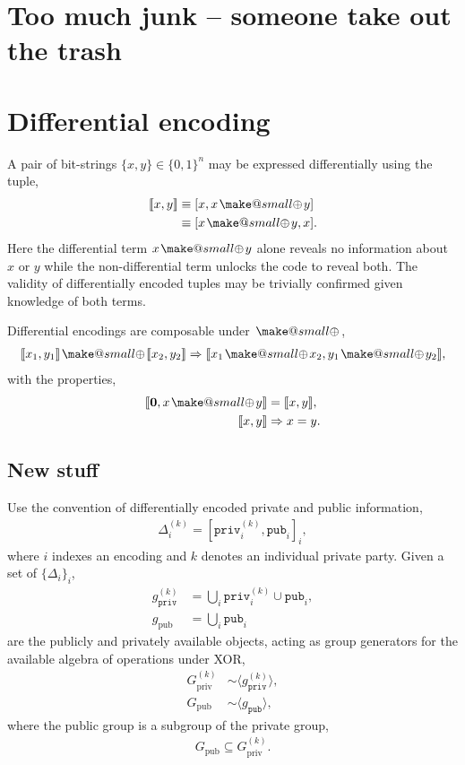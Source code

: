 \documentclass[twocolumn, aps, amsmath, amssymb, nofootinbib, superscriptaddress, longbibliography, doublefloatfix, table-of-contents, eqsecnum, rmp]{revtex4-2}
\makeatletter
\def\zerovec{\mathbf{0}}
\def\diff#1#2{\llbracket #1,#2\rrbracket}
\newcommand{\soplus}{{{\hspace{1pt}}{\mathbin{\mathpalette\make@small{\mathbin\oplus}}}}{\hspace{1pt}}}
\newcommand{\make@small}[2]{%
  \vcenter{\hbox{%
    \scalebox{0.6}{$\m@th#1#2$}%
  }}%
}
\makeatother
\begin{document}
\newpage

\section{Too much junk -- someone take out the trash}

\section{Differential encoding}

A pair of bit-strings $\{x,y\}\in\{0,1\}^n$ may be expressed differentially using the tuple,
\begin{align}
	\diff{x}{y} &\equiv [x,x\soplus y] \nonumber\\
	&\equiv [x\soplus y,x].
\end{align}
Here the differential term $x\soplus y$ alone reveals no information about $x$ or $y$ while the non-differential term unlocks the code to reveal both. The validity of differentially encoded tuples may be trivially confirmed given knowledge of both terms.

Differential encodings are composable under $\soplus$,
\begin{align}
	\diff{x_1}{y_1} \soplus \diff{x_2}{y_2} \Rightarrow \diff{x_1\soplus x_2}{y_1 \soplus y_2},
\end{align}
with the properties,
\begin{align}
	\diff{\zerovec}{x\soplus y} &= \diff{x}{y}, \nonumber\\
	\diff{x}{y} &\Rightarrow x=y.
\end{align}

\subsection{New stuff}

Use the convention of differentially encoded private and public information,
\begin{align}
	\Delta_i^{(k)} = [\mathtt{priv}_i^{(k)},\mathtt{pub}_i]_i,
\end{align}
where $i$ indexes an encoding and $k$ denotes an individual private party. Given a set of $\{\Delta_i\}_i$,
\begin{align}
	g_\mathtt{priv}^{(k)} &= \bigcup_i \mathtt{priv}_i^{(k)} \cup \mathtt{pub}_i,\nonumber\\
	g_\mathrm{pub} &=  \bigcup_i \mathtt{pub}_i
\end{align}
are the publicly and privately available objects, acting as group generators for the available algebra of operations under XOR,
\begin{align}
	G_\mathrm{priv}^{(k)} &\sim \langle g_\mathtt{priv}^{(k)} \rangle, \nonumber\\
	G_\mathrm{pub} &\sim \langle g_\mathtt{pub} \rangle,
\end{align}
where the public group is a subgroup of the private group,
\begin{align}
	G_\mathrm{pub} \subseteq G_\mathrm{priv}^{(k)}.
\end{align}
\end{document}
